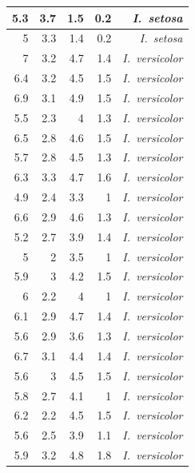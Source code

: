 \begin{enumerate}
\begin{center}
\begin{longtable}{|r|r|r|r|r|}
				\hline
				5.3   & 3.7   & 1.5   & 0.2   & \textit{I. setosa} \\
				\hline
				5     & 3.3   & 1.4   & 0.2   & \textit{I. setosa} \\
				\hline
				7     & 3.2   & 4.7   & 1.4   & \textit{I. versicolor} \\
				\hline
				6.4   & 3.2   & 4.5   & 1.5   & \textit{I. versicolor} \\
				\hline
				6.9   & 3.1   & 4.9   & 1.5   & \textit{I. versicolor} \\
				\hline
				5.5   & 2.3   & 4     & 1.3   & \textit{I. versicolor} \\
				\hline
				6.5   & 2.8   & 4.6   & 1.5   & \textit{I. versicolor} \\
				\hline
				5.7   & 2.8   & 4.5   & 1.3   & \textit{I. versicolor} \\
				\hline
				6.3   & 3.3   & 4.7   & 1.6   & \textit{I. versicolor} \\
				\hline
				4.9   & 2.4   & 3.3   & 1     & \textit{I. versicolor} \\
				\hline
				6.6   & 2.9   & 4.6   & 1.3   & \textit{I. versicolor} \\
				\hline
				5.2   & 2.7   & 3.9   & 1.4   & \textit{I. versicolor} \\
				\hline
				5     & 2     & 3.5   & 1     & \textit{I. versicolor} \\
				\hline
				5.9   & 3     & 4.2   & 1.5   & \textit{I. versicolor} \\
				\hline
				6     & 2.2   & 4     & 1     & \textit{I. versicolor} \\
				\hline
				6.1   & 2.9   & 4.7   & 1.4   & \textit{I. versicolor} \\
				\hline
				5.6   & 2.9   & 3.6   & 1.3   & \textit{I. versicolor} \\
				\hline
				6.7   & 3.1   & 4.4   & 1.4   & \textit{I. versicolor} \\
				\hline
				5.6   & 3     & 4.5   & 1.5   & \textit{I. versicolor} \\
				\hline
				5.8   & 2.7   & 4.1   & 1     & \textit{I. versicolor} \\
				\hline
				6.2   & 2.2   & 4.5   & 1.5   & \textit{I. versicolor} \\
				\hline
				5.6   & 2.5   & 3.9   & 1.1   & \textit{I. versicolor} \\
				\hline
				5.9   & 3.2   & 4.8   & 1.8   & \textit{I. versicolor} \\
				\hline

\end{longtable}
\end{center}
\end{enumerate}
